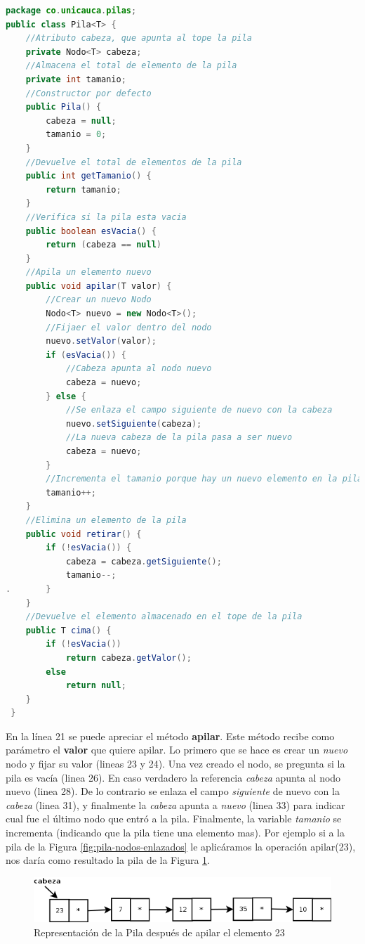 \begin{lstlisting}[language=Java]
package co.unicauca.pilas;
public class Pila<T> {
    //Atributo cabeza, que apunta al tope la pila
 	private Nodo<T> cabeza;
 	//Almacena el total de elemento de la pila
 	private int tamanio;
    //Constructor por defecto
 	public Pila() {
 		cabeza = null;
 		tamanio = 0;
 	}
	//Devuelve el total de elementos de la pila
 	public int getTamanio() {
 		return tamanio;
 	}
	//Verifica si la pila esta vacia
 	public boolean esVacia() {
 		return (cabeza == null)
 	}
	//Apila un elemento nuevo
 	public void apilar(T valor) {
	 	//Crear un nuevo Nodo
 		Nodo<T> nuevo = new Nodo<T>();
	 	//Fijaer el valor dentro del nodo
 		nuevo.setValor(valor);
 		if (esVacia()) {
	 		//Cabeza apunta al nodo nuevo
 			cabeza = nuevo;
 		} else {
	 		//Se enlaza el campo siguiente de nuevo con la cabeza
 			nuevo.setSiguiente(cabeza);
 			//La nueva cabeza de la pila pasa a ser nuevo
 			cabeza = nuevo;
 		}
 		//Incrementa el tamanio porque hay un nuevo elemento en la pila
 		tamanio++;
 	}
	//Elimina un elemento de la pila
 	public void retirar() {
 		if (!esVacia()) {
 			cabeza = cabeza.getSiguiente();
 			tamanio--;
. 		}
 	}
	//Devuelve el elemento almacenado en el tope de la pila
 	public T cima() {
 		if (!esVacia())
 			return cabeza.getValor();
 		else
 			return null;
 	}
 }
\end{lstlisting}

En la línea 21 se puede apreciar el método \textbf{apilar}. Este método recibe como parámetro el \textbf{valor} que quiere apilar. Lo primero que se hace es crear un \textit{nuevo} nodo y fijar su valor (lineas 23 y 24). Una vez creado el nodo, se pregunta si la pila es vacía (linea 26). En caso verdadero la referencia \textit{cabeza} apunta al nodo nuevo (linea 28). De lo contrario se enlaza el campo \textit{siguiente} de nuevo con la \textit{cabeza} (linea 31), y finalmente la \textit{cabeza} apunta a \textit{nuevo} (linea 33) para indicar cual fue el último nodo que entró a la pila. Finalmente, la variable \textit{tamanio} se incrementa (indicando que la pila tiene una elemento mas). Por ejemplo si a la pila de la Figura \ref{fig:pila-nodos-enlazados} le aplicáramos la operación apilar(23), nos daría como resultado la pila de la Figura \ref{fig:pila-nodos-enlazados-apilar}.

\begin{figure}
	\centering
	\includegraphics[scale=0.7]{images/RepresentacionPilaNodosEnlazadosApilar}
	\caption{Representación de la Pila después de apilar el elemento 23}	
	\label{fig:pila-nodos-enlazados-apilar}
\end{figure}

